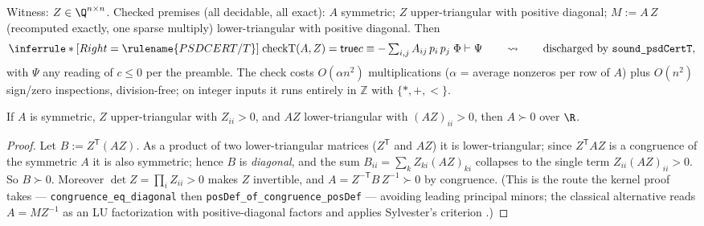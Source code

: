 \begin{brecipe}\label{rec:psdt-instance}
Witness: $Z \in \Q^{n\times n}$. Checked premises (all decidable, all
exact): $A$ symmetric; $Z$ upper-triangular with positive diagonal;
$M := A\,Z$ (recomputed exactly, one sparse multiply) lower-triangular
with positive diagonal. Then
\[
\inferrule*[Right=\rulename{PSDCERT/T}]
  {\;\mathrm{checkT}(A, Z) = \mathsf{true} \\
    c \equiv -\textstyle\sum_{i,j} A_{ij}\,p_i\,p_j\;}
  {\Phi \vdash \Psi}
\qquad\rightsquigarrow\qquad
\text{\upshape discharged by } \texttt{sound\_psdCertT},
\]
with $\Psi$ any reading of $c \leq 0$ per the preamble. The check costs
$O(\alpha n^2)$ multiplications ($\alpha$ = average nonzeros per row of
$A$) plus $O(n^2)$ sign/zero inspections, division-free; on integer
inputs it runs entirely in $\mathbb{Z}$ with $\{*, +, <\}$.
\end{brecipe}

\begin{bprop}\label{prop:psdt-matrix}
If $A$ is symmetric, $Z$ upper-triangular with $Z_{ii} > 0$, and $AZ$
lower-triangular with $(AZ)_{ii} > 0$, then $A \succ 0$ over $\R$.
\end{bprop}
\begin{proof}
Let $B := Z^{\mathsf T}(AZ)$. As a product of two lower-triangular
matrices ($Z^{\mathsf T}$ and $AZ$) it is lower-triangular; since
$Z^{\mathsf T} A Z$ is a congruence of the symmetric $A$ it is also
symmetric; hence $B$ is \emph{diagonal}, and the sum
$B_{ii} = \sum_k Z_{ki} (AZ)_{ki}$ collapses to the single term
$Z_{ii}(AZ)_{ii} > 0$. So $B \succ 0$. Moreover
$\det Z = \prod_i Z_{ii} > 0$ makes $Z$ invertible, and
$A = Z^{-\mathsf T} B\, Z^{-1} \succ 0$ by congruence. (This is the
route the kernel proof takes --- \texttt{congruence\_eq\_diagonal}
then \texttt{posDef\_of\_congruence\_posDef} --- avoiding leading
principal minors; the classical alternative reads $A = M Z^{-1}$ as an
LU factorization with positive-diagonal factors and applies Sylvester's
criterion \cite{hornjohnson2013}.)
\end{proof}

